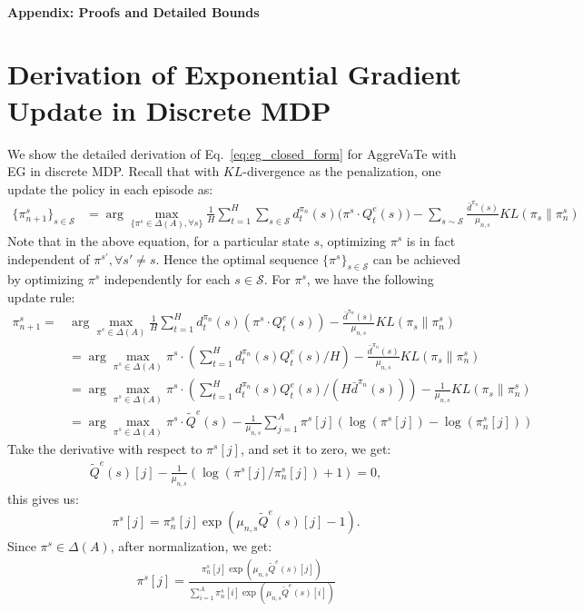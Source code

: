 \documentclass{article}
\begin{document}
{\small


}


\newpage
\onecolumn
\appendix
\paragraph{Appendix: Proofs and Detailed Bounds}

\section{Derivation of Exponential Gradient Update in Discrete MDP}
\label{sec:EG_derivation}
We show the detailed derivation of Eq.~\ref{eq:eg_closed_form} for AggreVaTe with EG in discrete MDP. Recall that with $KL$-divergence as the penalization, one update the policy in each episode as:
\begin{align}
\{\pi_{n+1}^s\}_{s\in\mathcal{S}} &= \arg\max_{\{\pi^s\in \Delta(A),\forall s\}}\frac{1}{H}\sum_{t=1}^H\sum_{s\in\mathcal{S}}d_t^{\pi_n}(s)\big( \pi^s\cdot Q_t^e(s)\big) - \sum_{s\sim\mathcal{S}}\frac{\bar{d}^{\pi_n}(s)}{\mu_{n,s}}KL(\pi_s \| \pi_n^s) \nonumber
\end{align} Note that in the above equation, for a particular state $s$, optimizing $\pi^s$ is in fact independent of $\pi^{s'}, \forall s'\neq s$. Hence the optimal sequence $\{\pi^s\}_{s\in\mathcal{S}}$ can be achieved by optimizing $\pi^s$ independently for each $s\in\mathcal{S}$. For $\pi^s$, we have the following update rule:
\begin{align}
\pi_{n+1}^s = &\arg\max_{\pi^s\in\Delta(A)}\frac{1}{H}\sum_{t=1}^H d_t^{\pi_n}(s)(\pi^s\cdot Q^e_t(s)) - \frac{\bar{d}^{\pi_n}(s)}{\mu_{n,s}}KL(\pi_s\| \pi_n^s) \nonumber\\
& = \arg\max_{\pi^s\in\Delta(A)}\pi^{s}\cdot (\sum_{t=1}^H d_t^{\pi_n}(s)Q_t^e(s) / H) - \frac{\bar{d}^{\pi_n}(s)}{\mu_{n,s}}KL(\pi_s\|\pi_n^s) \nonumber\\
& = \arg\max_{\pi^s\in\Delta(A)}\pi^{s}\cdot (\sum_{t=1}^H d_t^{\pi_n}(s)Q_t^e(s) /(H\bar{d}^{\pi_n}(s))) - \frac{1}{\mu_{n,s}}KL(\pi_s\|\pi_n^s) \nonumber\\
& = \arg\max_{\pi^s\in\Delta(A)}\pi^s\cdot \tilde{Q}^e(s) - \frac{1}{\mu_{n,s}}\sum_{j=1}^A \pi^s[j](\log(\pi^s[j]) - \log(\pi_n^s[j]))
\end{align} Take the derivative with respect to $\pi^s[j]$, and set  it to zero, we get:
\begin{align}
\tilde{Q}^e(s)[j] -\frac{1}{\mu_{n,s}}(\log(\pi^s[j]/\pi_n^s[j]) + 1) = 0,
\end{align} this gives us:
\begin{align}
\pi^s[j] = \pi_n^s[j]\exp(\mu_{n,s}\tilde{Q}^e(s)[j]-1).
\end{align} Since $\pi^s\in\Delta(A)$, after normalization, we get:
\begin{align}
\pi^s[j] = \frac{\pi_n^s[j]\exp(\mu_{n,s}\tilde{Q}^e(s)[j])}{\sum_{i=1}^A \pi_n^s[i]\exp(\mu_{n,s}\tilde{Q}^e(s)[i])}
\end{align}
\end{document}
